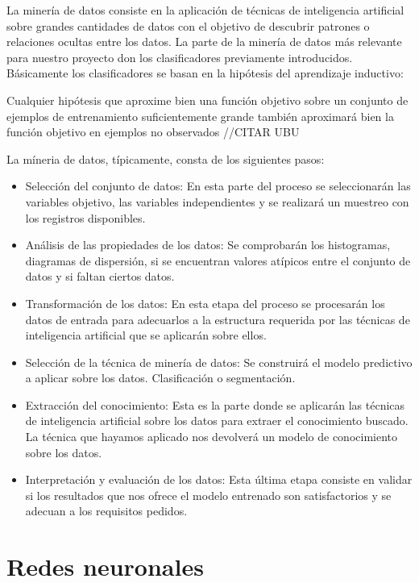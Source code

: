 La minería de datos consiste en la aplicación de técnicas de inteligencia artificial sobre grandes cantidades de datos con el objetivo de descubrir patrones o relaciones ocultas entre los datos. La parte de la minería de datos más relevante para nuestro proyecto don los clasificadores previamente introducidos. Básicamente los clasificadores se basan en la hipótesis del aprendizaje inductivo:

Cualquier hipótesis que aproxime bien una función objetivo sobre un conjunto de ejemplos de entrenamiento suficientemente grande también aproximará bien la función objetivo en ejemplos no observados //CITAR UBU

La míneria de datos, típicamente, consta de los siguientes pasos:
\begin{itemize}
	\item{Selección del conjunto de datos}: En esta parte del proceso se seleccionarán las variables objetivo, las variables independientes y se realizará un muestreo con los registros disponibles.
	\item{Análisis de las propiedades de los datos}: Se comprobarán los histogramas, diagramas de dispersión, si se encuentran valores atípicos entre el conjunto de datos y si faltan ciertos datos.
	\item{Transformación de los datos}: En esta etapa del proceso se procesarán los datos de entrada para adecuarlos a la estructura requerida por las técnicas de inteligencia artificial que se aplicarán sobre ellos.
	\item{Selección de la técnica de minería de datos}: Se construirá el modelo predictivo a aplicar sobre los datos. Clasificación o segmentación.
	\item{Extracción del conocimiento}: Esta es la parte donde se aplicarán las técnicas de inteligencia artificial sobre los datos para extraer el conocimiento buscado. La técnica que hayamos aplicado nos devolverá un modelo de conocimiento sobre los datos.
	\item{Interpretación y evaluación de los datos}: Esta última etapa consiste en validar si los resultados que nos ofrece el modelo entrenado son satisfactorios y se adecuan a los requisitos pedidos.
\end{itemize}

\cite{procesosMineriaDatos}

\section{Redes neuronales}

